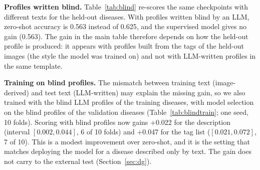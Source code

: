 \documentclass[11pt]{article}
\begin{document}
\textbf{Profiles written blind.} Table~\ref{tab:blind} re-scores the same checkpoints with different texts for the held-out diseases. With profiles written blind by an LLM, zero-shot accuracy is 0.563 instead of 0.625, and the supervised model gives no gain (0.563). The gain in the main table therefore depends on how the held-out profile is produced: it appears with profiles built from the tags of the held-out images (the style the model was trained on) and not with LLM-written profiles in the same template.
\begin{table}[t]\centering\small
\resizebox{\linewidth}{!}{}
\caption{PlantWild 10-fold CV, same fine-tuned checkpoints (seed 0, 10 folds), different texts for held-out diseases. Unit-macro top-1; interval is a bootstrap over folds. The model was trained with image-derived profiles of training diseases (description and tag styles).}\label{tab:blind}
\end{table}

\textbf{Training on blind profiles.} The mismatch between training text (image-derived) and test text (LLM-written) may explain the missing gain, so we also trained with the blind LLM profiles of the training diseases, with model selection on the blind profiles of the validation diseases (Table~\ref{tab:blindtrain}; one seed, 10 folds). Scoring with blind profiles now gains +0.022 for the description (interval $[0.002, 0.044]$, 6 of 10 folds) and +0.047 for the tag list ($[0.021, 0.072]$, 7 of 10). This is a modest improvement over zero-shot, and it is the setting that matches deploying the model for a disease described only by text. The gain does not carry to the external test (Section~\ref{sec:dg}).
\begin{table}[t]\centering\small
\resizebox{\linewidth}{!}{}
\caption{PlantWild 10-fold CV, models trained and selected on blind LLM profiles (seed 0). Unit-macro top-1; bootstrap interval over folds.}\label{tab:blindtrain}
\end{table}
\end{document}
